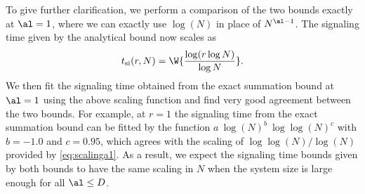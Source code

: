 To give further clarification, we perform a comparison of the two bounds exactly at $\al=1$, where we can exactly use $\log(N)$ in place of $N^{\al-1}$. The signaling time given by the analytical bound now scales as
\begin{equation}
	t_\text{si}(r,N) = \W{\frac{\log(r\log N)}{\log N}}.\label{eq:scalinga1}
\end{equation}
We then fit the signaling time obtained from the exact summation bound at $\al=1$ using the above scaling function and find very good agreement between the two bounds. For example, at $r=1$ the signaling time from the exact summation bound can be fitted by the function $ a\:\log(N)^b\:\log\log(N)^c$ with $b=-1.0$ and $c=0.95$, which agrees with the scaling of $\log\log(N)/\log(N)$ provided by \cref{eq:scalinga1}. As a result, we expect the signaling time bounds given by both bounds to have the same scaling in $N$ when the system size is large enough for all $\al\le D$.
